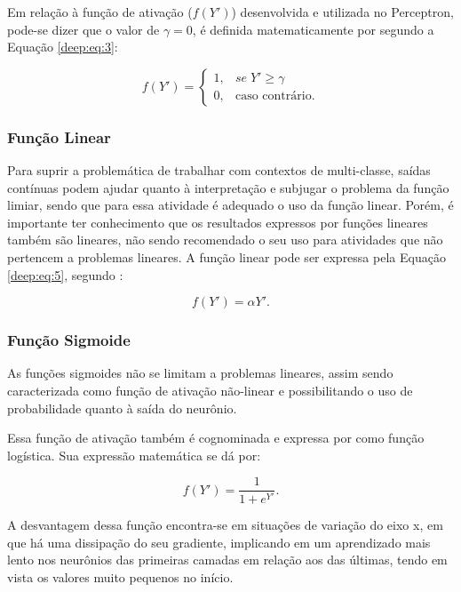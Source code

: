 Em relação à função de ativação ($f(Y')$) desenvolvida e utilizada no Perceptron, pode-se dizer que o valor de $\gamma = 0$, é definida matematicamente por \cite{mcculloch1943logical} segundo a Equação \ref{deep:eq:3}:

\begin{equation}
    \label{deep:eq:3}
    f(Y') = \left\{\begin{matrix}
     1,& se \; Y' \geq \gamma \\ 
     0,& \text{caso contrário}.
    \end{matrix}\right.
\end{equation}


\subsubsection{Função Linear}
Para suprir a problemática de trabalhar com contextos de multi-classe, saídas contínuas podem ajudar quanto à interpretação e subjugar o problema da função limiar, sendo que para essa atividade é adequado o uso da função linear. Porém, é importante ter conhecimento que os resultados expressos por funções lineares também são lineares, não sendo recomendado o seu uso para atividades que não pertencem a problemas lineares. A função linear pode ser expressa pela Equação \ref{deep:eq:5}, segundo \cite{Rosenblatt1958}:

\begin{equation}
    \label{deep:eq:5}
    f(Y') = \alpha Y'.
\end{equation}


\subsubsection{Função Sigmoide}
As funções sigmoides não se limitam a problemas lineares, assim sendo caracterizada como função de ativação não-linear e possibilitando o uso de probabilidade quanto à saída do neurônio.

Essa função de ativação também é cognominada e expressa por \cite{glorot2011deep} como função logística. Sua expressão matemática se dá por:

\begin{equation}
    \label{deep:eq:6}
    f(Y') = \frac{1}{1 + e^{Y'}}.
\end{equation}

A desvantagem dessa função encontra-se em situações de variação do eixo x, em que há uma  dissipação do seu gradiente, implicando em um aprendizado mais lento nos neurônios das primeiras camadas em relação aos das últimas, tendo em vista os valores muito pequenos no início.


